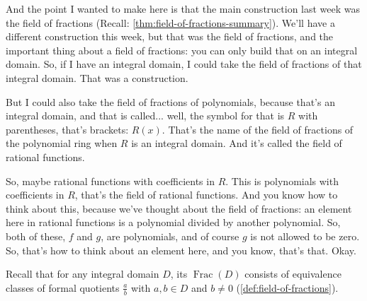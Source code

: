 \begin{speech}[00:07:07 - 00:08:35]
And the point I wanted to make here is that the main construction last week was the field of fractions (Recall: \cref{thm:field-of-fractions-summary}).  We'll have a different construction this week, but that was the field of fractions, and the important thing about a field of fractions: you can only build that on an integral domain. So, if I have an integral domain, I could take the field of fractions of that integral domain. That was a construction. 

But I could also take the field of fractions of polynomials, because that's an integral domain, and that is called... well, the symbol for that is $R$ with parentheses, that's brackets:  $R(x)$. That's the name of the field of fractions of the polynomial ring when $R$ is an integral domain. And it's called the field of rational functions. 

So, maybe rational functions with coefficients in $R$. This is polynomials with coefficients in $R$, that's the field of rational functions. And you know how to think about this, because we've thought about the field of fractions: an element here in rational functions is a polynomial divided by another polynomial. So, both of these, $f$ and $g$, are polynomials, and of course $g$ is not allowed to be zero.  So, that's how to think about an element here, and you know, that's that. Okay.
\end{speech}

\begin{content}
Recall that for any integral domain $D$, its  $\operatorname{Frac}(D)$ consists of equivalence classes of formal quotients $\frac{a}{b}$ with $a, b \in D$ and $b \neq 0$ (\cref{def:field-of-fractions}).

\end{content}

